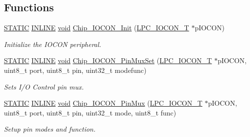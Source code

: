 \subsection*{Functions}
\begin{DoxyCompactItemize}
\item 
\hyperlink{group__LPC__Types__Public__Macros_ga10b2d890d871e1489bb02b7e70d9bdfb}{S\-T\-A\-T\-I\-C} \hyperlink{group__LPC__Types__Public__Types_ga2eb6f9e0395b47b8d5e3eeae4fe0c116}{I\-N\-L\-I\-N\-E} \hyperlink{Paradigm_2Tern__EE_2small_2portmacro_8h_a14d32f8130d3c0b212cfc751730b5b49}{void} \hyperlink{group__IOCON__17XX__40XX_ga40283d81f5ad91ba8b47647059721c9d}{Chip\-\_\-\-I\-O\-C\-O\-N\-\_\-\-Init} (\hyperlink{structLPC__IOCON__T}{L\-P\-C\-\_\-\-I\-O\-C\-O\-N\-\_\-\-T} $\ast$p\-I\-O\-C\-O\-N)
\begin{DoxyCompactList}\small\item\em Initialize the I\-O\-C\-O\-N peripheral. \end{DoxyCompactList}\item 
\hyperlink{group__LPC__Types__Public__Macros_ga10b2d890d871e1489bb02b7e70d9bdfb}{S\-T\-A\-T\-I\-C} \hyperlink{group__LPC__Types__Public__Types_ga2eb6f9e0395b47b8d5e3eeae4fe0c116}{I\-N\-L\-I\-N\-E} \hyperlink{Paradigm_2Tern__EE_2small_2portmacro_8h_a14d32f8130d3c0b212cfc751730b5b49}{void} \hyperlink{group__IOCON__17XX__40XX_ga5db68254cabb0d4cd4558d81557b77e4}{Chip\-\_\-\-I\-O\-C\-O\-N\-\_\-\-Pin\-Mux\-Set} (\hyperlink{structLPC__IOCON__T}{L\-P\-C\-\_\-\-I\-O\-C\-O\-N\-\_\-\-T} $\ast$p\-I\-O\-C\-O\-N, uint8\-\_\-t port, uint8\-\_\-t pin, uint32\-\_\-t modefunc)
\begin{DoxyCompactList}\small\item\em Sets I/\-O Control pin mux. \end{DoxyCompactList}\item 
\hyperlink{group__LPC__Types__Public__Macros_ga10b2d890d871e1489bb02b7e70d9bdfb}{S\-T\-A\-T\-I\-C} \hyperlink{group__LPC__Types__Public__Types_ga2eb6f9e0395b47b8d5e3eeae4fe0c116}{I\-N\-L\-I\-N\-E} \hyperlink{Paradigm_2Tern__EE_2small_2portmacro_8h_a14d32f8130d3c0b212cfc751730b5b49}{void} \hyperlink{group__IOCON__17XX__40XX_gaa2f90b2873cda51e67b3a67d6cc92617}{Chip\-\_\-\-I\-O\-C\-O\-N\-\_\-\-Pin\-Mux} (\hyperlink{structLPC__IOCON__T}{L\-P\-C\-\_\-\-I\-O\-C\-O\-N\-\_\-\-T} $\ast$p\-I\-O\-C\-O\-N, uint8\-\_\-t port, uint8\-\_\-t pin, uint32\-\_\-t mode, uint8\-\_\-t func)
\begin{DoxyCompactList}\small\item\em Setup pin modes and function. \end{DoxyCompactList}\item 

\end{DoxyCompactItemize}
